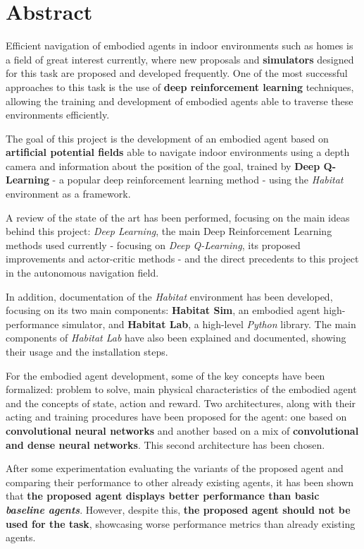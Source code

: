\newpage

\chapter*{Abstract}

Efficient navigation of embodied agents in indoor environments such as homes is a field of great interest currently, where new proposals and \textbf{simulators} designed for this task are proposed and developed frequently. One of the most successful approaches to this task is the use of \textbf{deep reinforcement learning} techniques, allowing the training and development of embodied agents able to traverse these environments efficiently.

The goal of this project is the development of an embodied agent based on \textbf{artificial potential fields} able to navigate indoor environments using a depth camera and information about the position of the goal, trained by \textbf{Deep Q-Learning} - a popular deep reinforcement learning method - using the \textit{Habitat} environment as a framework.

A review of the state of the art has been performed, focusing on the main ideas behind this project: \textit{Deep Learning}, the main Deep Reinforcement Learning methods used currently - focusing on \textit{Deep Q-Learning}, its proposed improvements and actor-critic methods - and the direct precedents to this project in the autonomous navigation field.

In addition, documentation of the \textit{Habitat} environment has been developed, focusing on its two main components: \textbf{Habitat Sim}, an embodied agent high-performance simulator, and \textbf{Habitat Lab}, a high-level \textit{Python} library. The main components of \textit{Habitat Lab} have also been explained and documented, showing their usage and the installation steps.

For the embodied agent development, some of the key concepts have been formalized: problem to solve, main physical characteristics of the embodied agent and the concepts of state, action and reward. Two architectures, along with their acting and training procedures have been proposed for the agent: one based on \textbf{convolutional neural networks} and another based on a mix of \textbf{convolutional and dense neural networks}. This second architecture has been chosen.

After some experimentation evaluating the variants of the proposed agent and comparing their performance to other already existing agents, it has been shown that \textbf{the proposed agent displays better performance than basic \textit{baseline agents}}. However, despite this, \textbf{the proposed agent should not be used for the task}, showcasing worse performance metrics than already existing agents.

